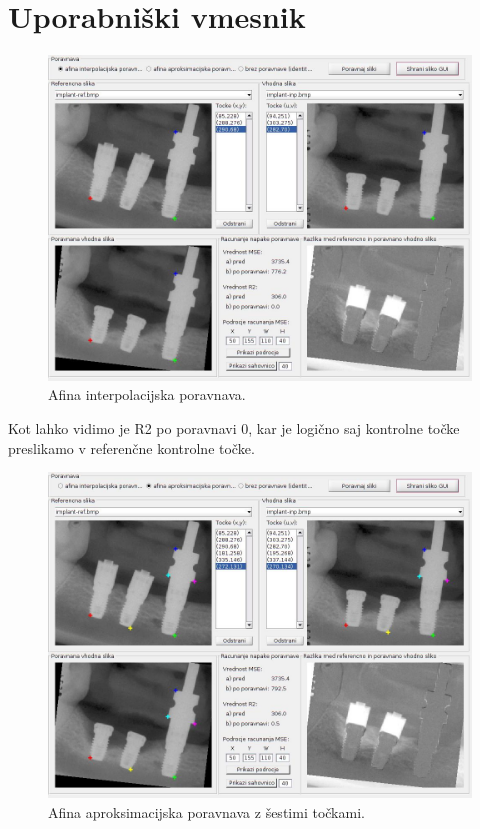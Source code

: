 \documentclass[12pt,a4paper]{article}
\begin{document}
\section{Uporabniški vmesnik}
\begin{figure}[h!]
  \begin{center}
    \includegraphics[scale = 0.4]{GUI1.jpg}
    \caption{Afina interpolacijska poravnava. }
    \label{fig:}
  \end{center}
\end{figure}
Kot lahko vidimo je R2 po poravnavi 0, kar je logično saj kontrolne točke preslikamo v referenčne kontrolne točke.
\begin{figure}[h!]
  \begin{center}
    \includegraphics[scale = 0.35]{GUI2.jpg}
    \caption{Afina aproksimacijska poravnava z šestimi točkami. }
    \label{fig:}
  \end{center}
\end{figure}
\end{document}
